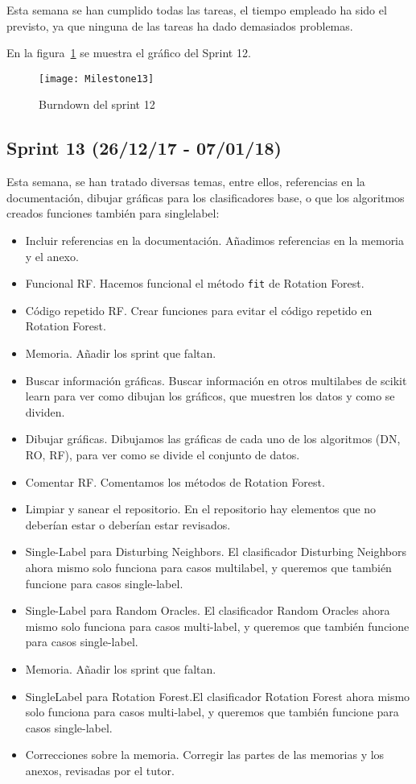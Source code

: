 Esta semana se han cumplido todas las tareas, el tiempo empleado ha sido el previsto, ya que ninguna de las tareas ha dado demasiados problemas.

En la figura~\ref{fig:Milestone13} se muestra el gráfico del Sprint 12.

\begin{figure}
\centering
\texttt{[image: Milestone13]}
\caption{Burndown del sprint 12}
\label{fig:Milestone13}
\end{figure}

\subsection{Sprint 13 (26/12/17 - 07/01/18)}
Esta semana, se han tratado diversas temas, entre ellos, referencias en la documentación, dibujar gráficas para los clasificadores base, o que los algoritmos creados funciones también para single\-label:
\begin{itemize}
\item Incluir referencias en la documentación. Añadimos referencias en la memoria y el anexo.
\item Funcional RF. Hacemos funcional el método \texttt{fit} de Rotation Forest.
\item Código repetido RF. Crear funciones para evitar el código repetido en Rotation Forest.
\item Memoria. Añadir los sprint que faltan.
\item Buscar información gráficas. Buscar información en otros multilabes de scikit learn para ver como dibujan los gráficos, que muestren los datos y como se dividen.
\item Dibujar gráficas. Dibujamos las gráficas de cada uno de los algoritmos (DN, RO, RF), para ver como se divide el conjunto de datos.
\item Comentar RF. Comentamos los métodos de Rotation Forest.
\item Limpiar y sanear el repositorio. En el repositorio hay elementos que no deberían estar o deberían estar revisados.
\item Single-Label para Disturbing Neighbors. El clasificador Disturbing Neighbors ahora mismo solo funciona para casos multi\-label, y queremos que también funcione para casos single-label.
\item Single-Label para Random Oracles. El clasificador Random Oracles ahora mismo solo funciona para casos multi-label, y queremos que también funcione para casos single-label.
\item Memoria. Añadir los sprint que faltan.
\item SingleLabel para Rotation Forest.El clasificador Rotation Forest ahora mismo solo funciona para casos multi-label, y queremos que también funcione para casos single-label.
\item Correcciones sobre la memoria. Corregir las partes de las memorias y los anexos, revisadas por el tutor.
\end{itemize}

